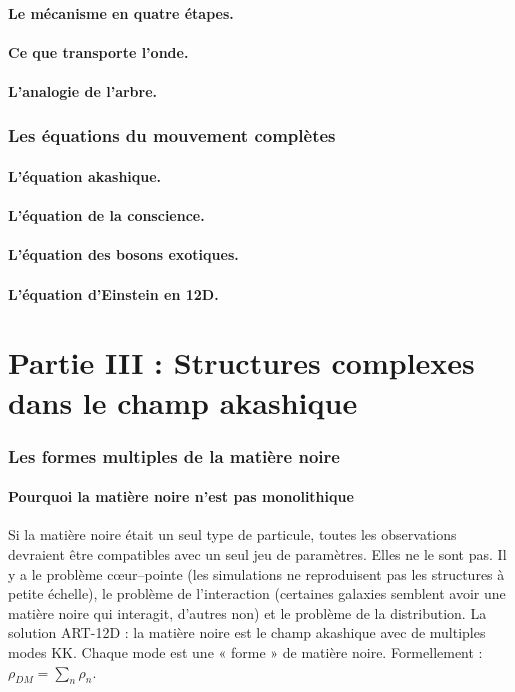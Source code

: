 \documentclass[11pt,a4paper]{article}
\begin{document}
\subsection{Le mécanisme en quatre étapes.}
\subsection{Ce que transporte l'onde.}
\subsection{L'analogie de l'arbre.}

\section{Les équations du mouvement complètes}
\subsection{L'équation akashique.}
\subsection{L'équation de la conscience.}
\subsection{L'équation des bosons exotiques.}
\subsection{L'équation d'Einstein en 12D.}

\newpage
\part*{Partie III : Structures complexes dans le champ akashique}

\section{Les formes multiples de la matière noire}
\subsection{Pourquoi la matière noire n'est pas monolithique}
Si la matière noire était un seul type de particule, toutes les observations devraient être compatibles avec un seul jeu de paramètres. Elles ne le sont pas. Il y a le problème cœur--pointe (les simulations ne reproduisent pas les structures à petite échelle), le problème de l'interaction (certaines galaxies semblent avoir une matière noire qui interagit, d'autres non) et le problème de la distribution. La solution ART-12D : la matière noire est le champ akashique avec de multiples modes KK. Chaque mode est une « forme » de matière noire. Formellement : $\rho_{DM} = \sum_n \rho_n$.
\end{document}
